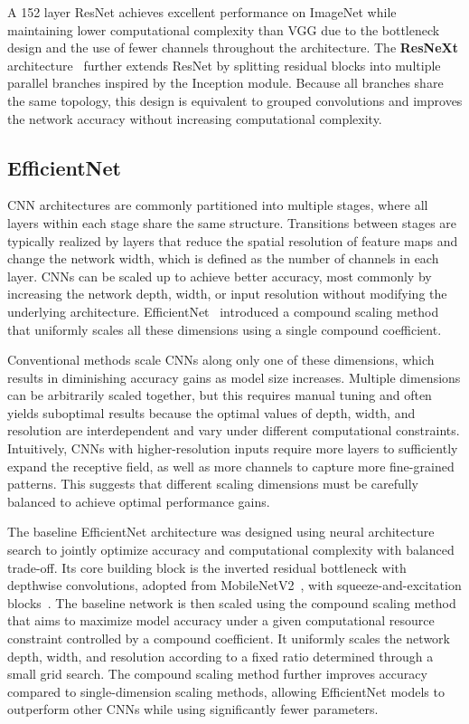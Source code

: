 A 152 layer ResNet achieves excellent performance on ImageNet while maintaining lower computational complexity than VGG due to the bottleneck design and the use of fewer channels throughout the architecture. The \textbf{ResNeXt} architecture~\cite{Xie2017} further extends ResNet by splitting residual blocks into multiple parallel branches inspired by the Inception module. Because all branches share the same topology, this design is equivalent to grouped convolutions and improves the network accuracy without increasing computational complexity.~\cite{He2016}

\subsection{EfficientNet} CNN architectures are commonly partitioned into multiple stages, where all layers within each stage share the same structure. Transitions between stages are typically realized by layers that reduce the spatial resolution of feature maps and change the network width, which is defined as the number of channels in each layer. CNNs can be scaled up to achieve better accuracy, most commonly by increasing the network depth, width, or input resolution without modifying the underlying architecture. EfficientNet~\cite{Tan2019} introduced a compound scaling method that uniformly scales all these dimensions using a single compound coefficient.

Conventional methods scale CNNs along only one of these dimensions, which results in diminishing accuracy gains as model size increases. Multiple dimensions can be arbitrarily scaled together, but this requires manual tuning and often yields suboptimal results because the optimal values of depth, width, and resolution are interdependent and vary under different computational constraints. Intuitively, CNNs with higher-resolution inputs require more layers to sufficiently expand the receptive field, as well as more channels to capture more fine-grained patterns. This suggests that different scaling dimensions must be carefully balanced to achieve optimal performance gains.

The baseline EfficientNet architecture was designed using neural architecture search to jointly optimize accuracy and computational complexity with balanced trade-off. Its core building block is the inverted residual bottleneck with depthwise convolutions, adopted from MobileNetV2~\cite{Sandler2018}, with squeeze-and-excitation blocks~\cite{Hu2020}. The baseline network is then scaled using the compound scaling method that aims to maximize model accuracy under a given computational resource constraint controlled by a compound coefficient. It uniformly scales the network depth, width, and resolution according to a fixed ratio determined through a small grid search. The compound scaling method further improves accuracy compared to single-dimension scaling methods, allowing EfficientNet models to outperform other CNNs while using significantly fewer parameters.~\cite{Tan2019}

